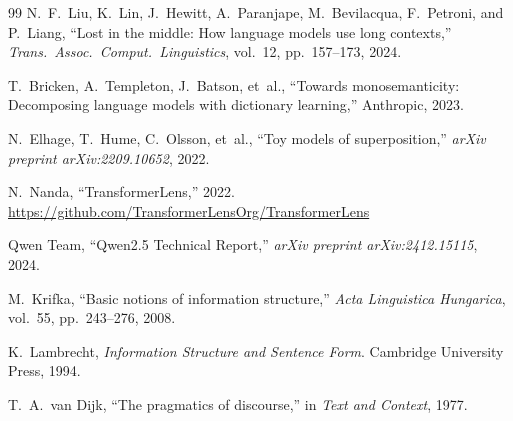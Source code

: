 \documentclass[10pt, letterpaper]{article}
\begin{document}
\begin{thebibliography}{99}
N.~F.~Liu, K.~Lin, J.~Hewitt, A.~Paranjape, M.~Bevilacqua, F.~Petroni, and P.~Liang, ``Lost in the middle: How language models use long contexts,'' \textit{Trans.\ Assoc.\ Comput.\ Linguistics}, vol.~12, pp.~157--173, 2024.

T.~Bricken, A.~Templeton, J.~Batson, et~al., ``Towards monosemanticity: Decomposing language models with dictionary learning,'' Anthropic, 2023.

N.~Elhage, T.~Hume, C.~Olsson, et~al., ``Toy models of superposition,'' \textit{arXiv preprint arXiv:2209.10652}, 2022.

N.~Nanda, ``TransformerLens,'' 2022. \url{https://github.com/TransformerLensOrg/TransformerLens}

Qwen Team, ``Qwen2.5 Technical Report,'' \textit{arXiv preprint arXiv:2412.15115}, 2024.

M.~Krifka, ``Basic notions of information structure,'' \textit{Acta Linguistica Hungarica}, vol.~55, pp.~243--276, 2008.

K.~Lambrecht, \textit{Information Structure and Sentence Form}. Cambridge University Press, 1994.

T.~A.~van Dijk, ``The pragmatics of discourse,'' in \textit{Text and Context}, 1977.

\end{thebibliography}
\end{document}

